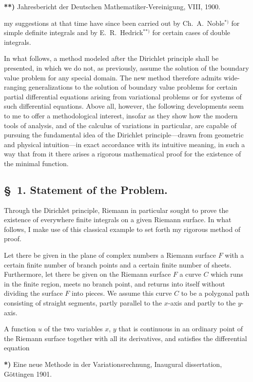 \documentclass{article}
\begin{document}
\textbf{**)} Jahresbericht der Deutschen Mathematiker-Vereinigung, VIII, 1900.

my suggestions at that time have since been carried out by Ch.~A.~Noble${}^{*)}$ for simple definite integrals and by E.~R.~Hedrick${}^{**)}$ for certain cases of double integrals.

In what follows, a method modeled after the Dirichlet principle shall be presented, in which we do not, as previously, assume the solution of the boundary value problem for any special domain. The new method therefore admits wide-ranging generalizations to the solution of boundary value problems for certain partial differential equations arising from variational problems or for systems of such differential equations. Above all, however, the following developments seem to me to offer a methodological interest, insofar as they show how the modern tools of analysis, and of the calculus of variations in particular, are capable of pursuing the fundamental idea of the Dirichlet principle—drawn from geometric and physical intuition—in exact accordance with its intuitive meaning, in such a way that from it there arises a rigorous mathematical proof for the existence of the minimal function.

\subsection*{§~1. Statement of the Problem.}

Through the Dirichlet principle, Riemann in particular sought to prove the existence of everywhere finite integrals on a given Riemann surface. In what follows, I make use of this classical example to set forth my rigorous method of proof.

Let there be given in the plane of complex numbers a Riemann surface $F$ with a certain finite number of branch points and a certain finite number of sheets. Furthermore, let there be given on the Riemann surface $F$ a curve $C$ which runs in the finite region, meets no branch point, and returns into itself without dividing the surface $F$ into pieces. We assume this curve $C$ to be a polygonal path consisting of straight segments, partly parallel to the $x$-axis and partly to the $y$-axis.

A function $u$ of the two variables $x$, $y$ that is continuous in an ordinary point of the Riemann surface together with all its derivatives, and satisfies the differential equation

\textbf{*)} Eine neue Methode in der Variationsrechnung, Inaugural dissertation, Göttingen 1901.
\end{document}

